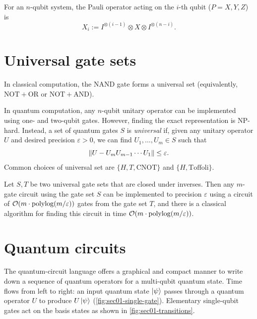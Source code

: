 \begin{example}
For an $n$-qubit system, the Pauli operator acting on the $i$-th qubit
($P = X, Y, Z$) is
\begin{equation}
  X_i := I^{\otimes(i-1)} \otimes X \otimes I^{\otimes(n-i)}.
\end{equation}
\end{example}

\section{Universal gate sets}\label{sec:sec01-universal}

In classical computation, the NAND gate forms a universal set (equivalently,
$\mathrm{NOT} + \mathrm{OR}$ or $\mathrm{NOT} + \mathrm{AND}$).

In quantum computation, any $n$-qubit unitary operator can be implemented using
one- and two-qubit gates. However, finding the exact representation is NP-hard.
Instead, a set of quantum gates $S$ is \emph{universal} if, given any unitary
operator $U$ and desired precision $\varepsilon > 0$, we can find
$U_1, \dots, U_m \in S$ such that
\begin{equation}
  \left\lVert U - U_m U_{m-1} \cdots U_1 \right\rVert \le \varepsilon.
\end{equation}
Common choices of universal set are $\{H, T, \mathrm{CNOT}\}$ and
$\{H, \text{Toffoli}\}$.

\begin{theorem}
Let $S, T$ be two universal gate sets that are closed under inverses. Then any
$m$-gate circuit using the gate set $S$ can be implemented to precision
$\varepsilon$ using a circuit of $\mathcal{O}(m \cdot \operatorname{polylog}(m/\varepsilon))$ gates
from the gate set $T$, and there is a classical algorithm for finding this
circuit in time $\mathcal{O}(m \cdot \operatorname{polylog}(m/\varepsilon))$.
\end{theorem}

\section{Quantum circuits}\label{sec:sec01-circuits}

The quantum-circuit language offers a graphical and compact manner to write down
a sequence of quantum operators for a multi-qubit quantum state. Time flows from
left to right: an input quantum state $\ket{\psi}$ passes through a quantum
operator $U$ to produce $U\ket{\psi}$ (\cref{fig:sec01-single-gate}). Elementary
single-qubit gates act on the basis states as shown in
\cref{fig:sec01-transitions}.

